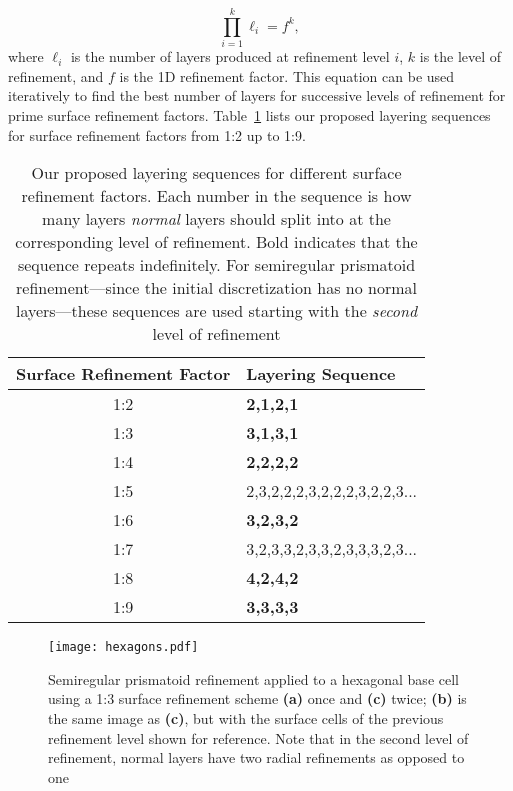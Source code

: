 \begin{equation*}
\prod_{i = 1}^{k} \ell_{i} = f^{k},
\end{equation*}
%
where $\ell_{i}$ is the number of layers produced at refinement level $i$, $k$ is the level of refinement, and $f$ is the 1D refinement factor.
This equation can be used iteratively to find the best number of layers for successive levels of refinement for prime surface refinement factors.
Table~\ref{tab:layers} lists our proposed layering sequences for surface refinement factors from 1:2 up to 1:9.


\begin{table}[h]
	\centering
	\begin{tabular}{@{}cl@{}}
		\toprule
		Surface Refinement Factor & Layering Sequence       \\ \midrule
		1:2                  & \textbf{2,1,2,1}             \\ 
		1:3                  & \textbf{3,1,3,1}             \\ 
		1:4                  & \textbf{2,2,2,2}             \\ 
		1:5                  & 2,3,2,2,2,3,2,2,2,3,2,2,3... \\ 
		1:6                  & \textbf{3,2,3,2}             \\ 
		1:7                  & 3,2,3,3,2,3,3,2,3,3,3,2,3... \\ 
		1:8                  & \textbf{4,2,4,2}             \\
		1:9                  & \textbf{3,3,3,3}             \\ \bottomrule
	\end{tabular}
	\caption{Our proposed layering sequences for different surface refinement factors.
		Each number in the sequence is how many layers \textit{normal} layers should split into at the corresponding level of refinement.
		Bold indicates that the sequence repeats indefinitely.
		For semiregular prismatoid refinement---since the initial discretization has no normal layers---these sequences are used starting with the \textit{second} level of refinement}
	\label{tab:layers}
\end{table}


\begin{figure}[h]
	\centering
	\texttt{[image: hexagons.pdf]}
	\caption{Semiregular prismatoid refinement applied to a hexagonal base cell using a 1:3 surface refinement scheme \textbf{(a)} once and \textbf{(c)} twice; \textbf{(b)} is the same image as \textbf{(c)}, but with the surface cells of the previous refinement level shown for reference.
		Note that in the second level of refinement, normal layers have two radial refinements as opposed to one}
	\label{fig:hexagons}
\end{figure}


